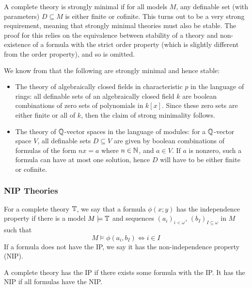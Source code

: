 \begin{exmp}
  A complete theory is strongly minimal if for all models $M$, any definable set (with parameters)
  $D \subseteq M$ is either finite or cofinite. This turns out to be a very strong requirement,
  meaning that strongly minimal theories must also be stable. The proof for this relies on the
  equivalence between stability of a theory and non-existence of a formula with the strict order
  property (which is slightly different from the order property), and so is omitted.

  We know from \cite{marker02} that the following are strongly minimal and hence stable:
  \begin{itemize}
    \item The theory of algebraically closed fields in characteristic $p$ in the language of rings:
      all definable sets of an algebraically closed field $k$ are boolean combinations of zero sets
      of polynomials in $k[x]$. Since these zero sets are either finite or all of $k$, then the
      claim of strong minimality follows.
    \item The theory of $\mathbb{Q}$-vector spaces in the language of modules: for a $\mathbb{Q}$-vector space $V$,
      all definable sets $D \subseteq V$ are given by boolean combinations of formulas of the form
      $nx = a$ where $n \in \mathbb{N}$, and $a \in V$. If $a$ is nonzero, such a formula can have at most
      one solution, hence $D$ will have to be either finite or cofinite.
  \end{itemize}
\end{exmp}

\subsubsection{NIP Theories}
\label{ssub:nip_theories}

\begin{defn}
  For a complete theory $\mathbb{T}$, we say that a formula $\phi(x;y)$ has the independence property
  if there is a model $M \models \mathbb{T}$ and sequences $(a_i)_{i<\omega}$,
  $(b_I)_{I \subseteq \omega}$ in $M$ such that
  \begin{equation*}
    M \models \phi(a_i,b_I) \iff i \in I
  \end{equation*}
  If a formula does not have the IP, we say it has the non-independence property (NIP).
\end{defn}

\begin{defn}
  A complete theory has the IP if there exists some formula with the IP. It has the NIP if all
  formulas have the NIP.
\end{defn}

